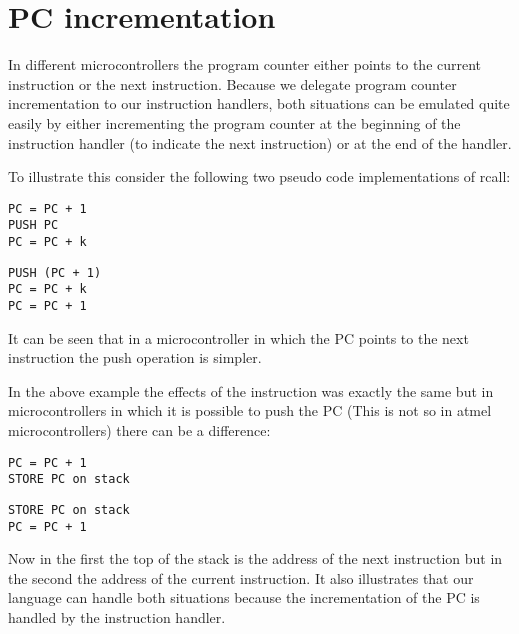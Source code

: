 
\section[PC incrementation]{PC incrementation}
In different microcontrollers the program counter either points to the
current instruction or the next instruction. Because we delegate
program counter incrementation to our instruction handlers, both
situations can be emulated quite easily by either incrementing the
program counter at the beginning of the instruction handler (to
indicate the next instruction) or at the end of the handler.

To illustrate this consider the following two pseudo code
implementations of rcall:

\lstset{caption=PC points to next instruction}
\begin{lstlisting}
PC = PC + 1
PUSH PC
PC = PC + k
\end{lstlisting}

\lstset{caption=PC points to current instruction}
\begin{lstlisting}
PUSH (PC + 1)
PC = PC + k
PC = PC + 1
\end{lstlisting}

It can be seen that in a microcontroller in which the PC points to the
next instruction the push operation is simpler.

In the above example the effects of the instruction was exactly the same
but in microcontrollers in which it is possible to push the PC (This
is not so in atmel microcontrollers) there can be a difference:

\lstset{caption=PC points to next instruction}
\begin{lstlisting}
PC = PC + 1
STORE PC on stack
\end{lstlisting}

\lstset{caption=PC points to current instruction}
\begin{lstlisting}
STORE PC on stack
PC = PC + 1
\end{lstlisting}

Now in the first the top of the stack is the address of the next
instruction but in the second the address of the current instruction.
It also illustrates that our language can handle both situations
because the incrementation of the PC is handled by the instruction
handler.
